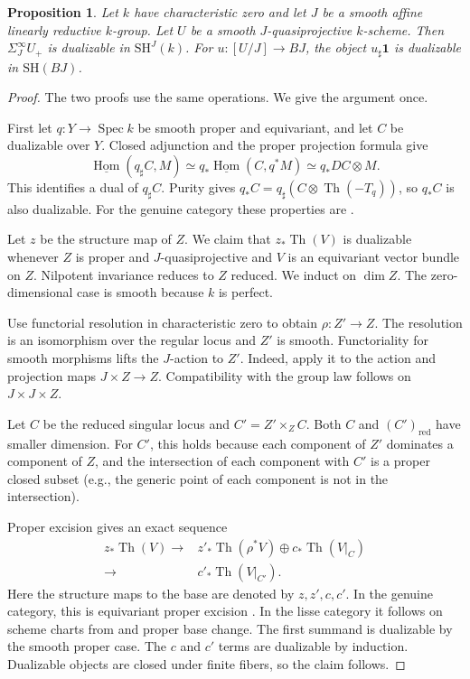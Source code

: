 \documentclass[11pt,reqno]{amsart}
\newtheorem{proposition}[theorem]{Proposition}
\theoremstyle{definition}
\theoremstyle{remark}
\theoremstyle{plain}
\numberwithin{equation}{section}
\newcommand{\SH}{\mathrm{SH}}
\newcommand{\one}{\mathbf 1}
\newcommand{\Hom}{\underline{\operatorname{Hom}}}
\DeclareMathOperator{\Spec}{Spec}
\DeclareMathOperator{\Th}{Th}
\begin{document}
\begin{proposition}\label{prop:geometric-duality}
Let \(k\) have characteristic zero and let \(J\) be a smooth affine linearly reductive \(k\)-group.
Let \(U\) be a smooth \(J\)-quasiprojective \(k\)-scheme.
Then \(\Sigma_J^\infty U_+\) is dualizable in \(\SH^J(k)\).
For \(u:[U/J]\to BJ\), the object \(u_\sharp\one\) is dualizable in \(\SH(BJ)\).
\end{proposition}
\begin{proof}
The two proofs use the same operations.
We give the argument once.

First let \(q:Y\to\Spec k\) be smooth proper and equivariant, and let \(C\) be dualizable over \(Y\).
Closed adjunction and the proper projection formula give
\[
 \Hom(q_\sharp C,M)
 \simeq q_*\Hom(C,q^*M)
 \simeq q_*DC\otimes M.
\]
This identifies a dual of \(q_\sharp C\).
Purity gives \(q_*C=q_\sharp(C\otimes\Th(-T_q))\), so \(q_*C\) is also dualizable.
For the genuine category these properties are
\cite[Theorems~6.9 and 6.18]{Hoyois}.

Let \(z\) be the structure map of \(Z\). 
We claim that \(z_*\Th(V)\) is dualizable whenever \(Z\) is proper and \(J\)-quasiprojective
and \(V\) is an equivariant vector bundle on \(Z\).
Nilpotent invariance reduces to \(Z\) reduced.
We induct on \(\dim Z\).
The zero-dimensional case is smooth because \(k\) is perfect.

Use functorial resolution in characteristic zero
\cite[Theorem~1.2.1]{Temkin} to obtain \(\rho:Z'\to Z\).
The resolution is an isomorphism over the regular locus and \(Z'\) is smooth.
Functoriality for smooth morphisms lifts the \(J\)-action to \(Z'\).
Indeed, apply it to the action and projection maps \(J\times Z\to Z\).
Compatibility with the group law follows on \(J\times J\times Z\).

Let \(C\) be the reduced singular locus and \(C'=Z'\times_Z C\).
Both \(C\) and \((C')_{\mathrm{red}}\) have smaller dimension.
For \(C'\), this holds because each component of \(Z'\) dominates a component of \(Z\),
and the intersection of each component with \(C'\) is a proper closed subset 
(e.g., the generic point of each component is not in the intersection).

Proper excision gives an exact sequence
\begin{equation}\label{eq:proper-excision}
\begin{split}
 z_*\Th(V)\longrightarrow{}&
 z'_*\Th(\rho^*V)\oplus c_*\Th(V|_C)\\
 \longrightarrow{}&c'_*\Th(V|_{C'}).
\end{split}
\end{equation}
Here the structure maps to the base are denoted by \(z,z',c,c'\).
In the genuine category, this is equivariant proper excision \cite[Corollary~6.25]{Hoyois}.
In the lisse category it follows on scheme charts from \cite[Theorem~2.48]{Khan}
and proper base change.
The first summand is dualizable by the smooth proper case.
The \(c\) and \(c'\) terms are dualizable by induction.
Dualizable objects are closed under finite fibers, so the claim follows.


\end{proof}
\end{document}
